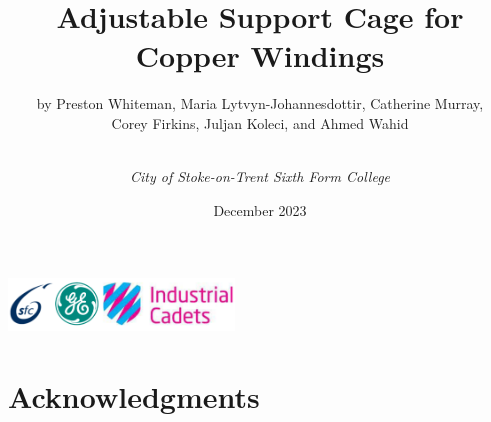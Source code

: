 \documentclass[a4paper,10pt]{article}
\title{\textbf{Adjustable Support Cage for Copper Windings}}
\author{by Preston Whiteman, Maria Lytvyn-Johannesdottir, Catherine Murray, \\ Corey Firkins, Juljan Koleci, and Ahmed Wahid\and \\ \textit{City of Stoke-on-Trent Sixth Form College}}
\date{December 2023}
\begin{document}

\maketitle
\begin{center}
    \includegraphics[width = 6cm, height = 1.5cm]{logos.png}
\end{center}
\pagebreak



\tableofcontents
\pagebreak



\section{Acknowledgments}
\end{document}
